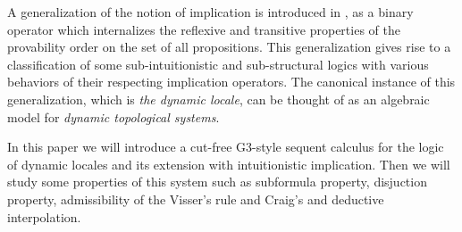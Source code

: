 A generalization of the notion of implication is introduced in \cite{amir}, as a binary operator which internalizes the reflexive and transitive properties of the provability order on the set of all propositions. This generalization gives rise to a classification of some sub-intuitionistic and sub-structural logics with various behaviors of their respecting implication operators. The canonical instance of this generalization, which is \emph{the dynamic locale}, can be thought of as an algebraic model for \emph{dynamic topological systems}.

In this paper we will introduce a cut-free G3-style sequent calculus for the logic of dynamic locales and its extension with intuitionistic implication. Then we will study some properties of this system such as subformula property, disjuction property, admissibility of the Visser's rule and Craig's and deductive interpolation.